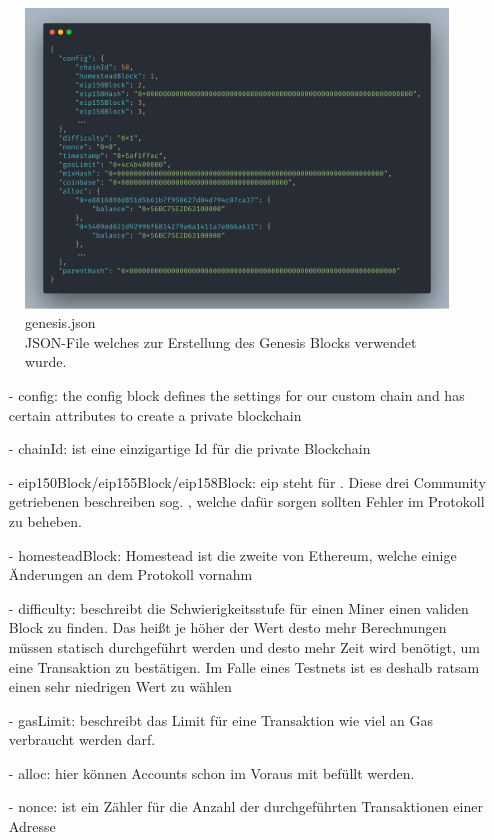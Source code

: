 \begin{figure}[th!]
	\centering
	\includegraphics[width=.9\columnwidth]{./Abbildungen/Kapitel_03/genesis.json.png}
	\caption{
		genesis.json\\
		JSON-File welches zur Erstellung des Genesis Blocks verwendet wurde.
	}
	\label{img:gen}
\end{figure}

\begin{itemize}
	\item[-] config: the config block defines the settings for our custom chain and has certain attributes to create a private blockchain
	      	 
	\item[-] chainId: ist eine einzigartige Id für die private Blockchain
	      
	\item[-] eip150Block/eip155Block/eip158Block: eip steht für . Diese drei Community getriebenen  beschreiben sog. , welche dafür sorgen sollten Fehler im Protokoll zu beheben. 
	      
	\item[-] homesteadBlock: Homestead ist die zweite  von Ethereum, welche einige Änderungen an dem Protokoll vornahm
	      	
	\item[-] difficulty: beschreibt die Schwierigkeitsstufe für einen Miner einen validen Block zu finden. Das heißt je höher der Wert desto mehr Berechnungen müssen statisch durchgeführt werden und desto mehr Zeit wird benötigt, um eine Transaktion zu bestätigen. Im Falle eines Testnets ist es deshalb ratsam einen sehr niedrigen Wert zu wählen
	      	
	\item[-] gasLimit: beschreibt das Limit für eine Transaktion wie viel an Gas verbraucht werden darf. 
	      
	\item[-] alloc: hier können Accounts schon im Voraus mit  befüllt werden.
	\item[-] nonce: ist ein Zähler für die Anzahl der durchgeführten Transaktionen einer Adresse
\end{itemize}

